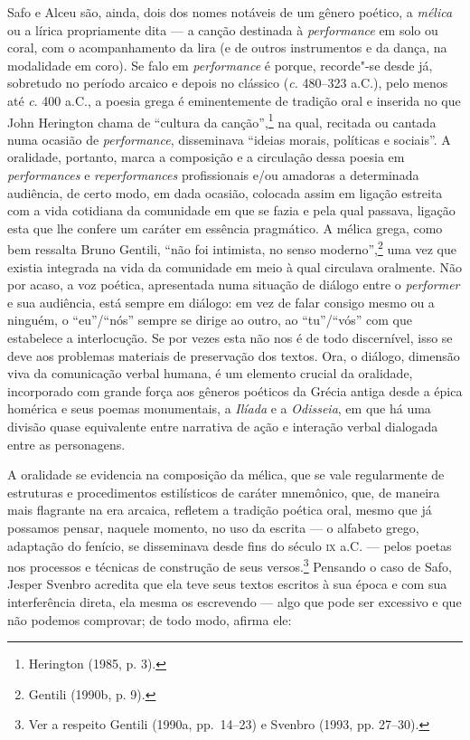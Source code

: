 Safo e Alceu são, ainda, dois dos nomes notáveis de um gênero poético, a
\textit{mélica} ou a lírica propriamente dita --- a canção destinada à
\textit{performance} em solo ou coral,
com o acompanhamento da lira (e de outros instrumentos e da dança, na
modalidade em coro). Se falo em \textit{performance} é porque, recorde"-se
desde já, sobretudo no período arcaico e depois no clássico (\textit{c.}
480--323 a.C.), pelo menos até \textit{c}. 400 a.C., a poesia grega é eminentemente de tradição oral e inserida no
que John Herington chama de “cultura da canção”,\footnote{ Herington (1985, p. 3).} na
qual, recitada ou cantada numa ocasião de \textit{performance}, disseminava
“ideias morais, políticas e sociais”. A oralidade, portanto, marca
a composição e a circulação dessa poesia em \textit{performances} e
\textit{reperformances} profissionais e/ou amadoras a determinada
audiência, de certo modo, em dada ocasião, colocada assim em ligação estreita
com a vida cotidiana da comunidade em que se fazia e pela qual passava, ligação
esta que lhe confere um caráter em essência pragmático. A mélica grega,
como bem ressalta Bruno Gentili, “não foi intimista, no senso
moderno”,\footnote{ Gentili (1990b, p. 9).} uma vez que existia integrada na
vida da comunidade em meio à qual
circulava oralmente. Não por acaso, a voz poética, apresentada numa
situação de diálogo entre o \textit{performer} e sua audiência, está sempre em
diálogo: em vez de falar consigo mesmo ou a ninguém, o “eu”/“nós” sempre
se dirige ao outro, ao “tu”/“vós” com que estabelece a interlocução. Se por
vezes esta não nos é de todo discernível, isso se deve aos problemas
materiais de preservação dos textos. Ora, o diálogo, dimensão viva da
comunicação verbal humana, é um elemento crucial da oralidade, incorporado com
grande força aos gêneros poéticos da Grécia antiga desde a épica homérica e
seus poemas monumentais, a \textit{Ilíada} e a \textit{Odisseia}, em que há uma
divisão quase equivalente entre narrativa de ação e interação verbal dialogada entre as personagens. 

A oralidade se evidencia na composição da mélica, que se vale regularmente de
estruturas e procedimentos estilísticos de caráter mnemônico, que,
de maneira mais flagrante na era arcaica, refletem a tradição poética oral,
mesmo que já possamos pensar, naquele momento, no uso da escrita --- o alfabeto
grego, adaptação do fenício, se disseminava desde fins do século \textsc{ix} a.C. ---
pelos poetas nos processos e técnicas de construção de seus
versos.\footnote{ Ver a respeito Gentili (1990a, pp.~14--23) e Svenbro (1993, pp.
27--30).} Pensando o caso de Safo, Jesper Svenbro acredita
que ela teve seus textos escritos à sua época e com sua interferência direta,
ela mesma os escrevendo --- algo que pode ser excessivo e que não podemos
comprovar; de todo modo, afirma ele:

